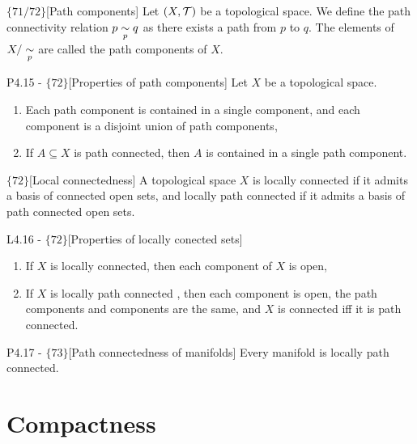 \documentclass{article}
\begin{document}
\begin{flexidefinition}{$\{71/72\}$}[Path components]
    Let $(X,\mathcal{T})$ be a topological space. We define the path connectivity relation $p \underset{p}{\sim} q$ as there exists a path from $p$ to $q$. The elements of $X / \underset{p}{\sim}$ are called the path components of $X$.
\end{flexidefinition}

\begin{flexilemma}{P4.15 - $\{72\}$}[Properties of path components]
    Let $X$ be a topological space. 
    \begin{enumerate}[label = (\alph*)]
        \item Each path component is contained in a single component, and each component is a disjoint union of path components,
        \item If $A \subseteq X$ is path connected, then $A$ is contained in a single path component.
    \end{enumerate}
\end{flexilemma}

\begin{flexidefinition}{$\{72\}$}[Local connectedness]
    A topological space $X$ is locally connected if it admits a basis of connected open sets, and locally path connected if it admits a basis of path connected open sets.
\end{flexidefinition}

\begin{flexilemma}{L4.16 - $\{72\}$}[Properties of locally conected sets]
    \begin{enumerate}[label = (\alph*)]
        \item If $X$ is locally connected, then each component of $X$ is open,
        \item If $X$ is locally path connected , then each component is open, the path components and components are the same, and $X$ is connected iff it is path connected.
    \end{enumerate}
\end{flexilemma}

\begin{flexitheorem}{P4.17 - $\{73\}$}[Path connectedness of manifolds]
    Every manifold is locally path connected.
\end{flexitheorem}


\section{Compactness}
\end{document}
